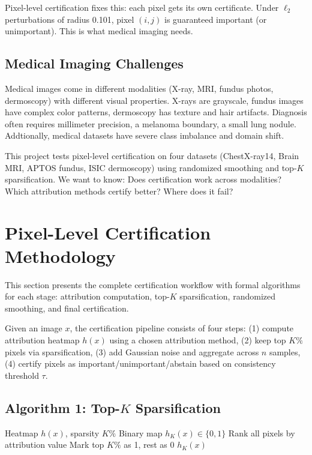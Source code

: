 \documentclass[11pt]{article}
\begin{document}
Pixel-level certification fixes this: each pixel gets its own certificate. Under $\ell_2$ perturbations of radius 0.101, pixel $(i,j)$ is guaranteed important (or unimportant). This is what medical imaging needs.

\subsection{Medical Imaging Challenges}

Medical images come in different modalities (X-ray, MRI, fundus photos, dermoscopy) with different visual properties. X-rays are grayscale, fundus images have complex color patterns, dermoscopy has texture and hair artifacts. Diagnosis often requires millimeter precision, a melanoma boundary, a small lung nodule. Addtionally, medical datasets have severe class imbalance and domain shift.

This project tests pixel-level certification on four datasets (ChestX-ray14, Brain MRI, APTOS fundus, ISIC dermoscopy) using randomized smoothing and top-$K$ sparsification. We want to know: Does certification work across modalities? Which attribution methods certify better? Where does it fail?

\section{Pixel-Level Certification Methodology}

This section presents the complete certification workflow with formal algorithms for each stage: attribution computation, top-$K$ sparsification, randomized smoothing, and final certification.

Given an image $x$, the certification pipeline consists of four steps: (1) compute attribution heatmap $h(x)$ using a chosen attribution method, (2) keep top $K\%$ pixels via sparsification, (3) add Gaussian noise and aggregate across $n$ samples, (4) certify pixels as important/unimportant/abstain based on consistency threshold $\tau$.

\subsection{Algorithm 1: Top-$K$ Sparsification}

\begin{algorithm}[H]
\caption{Top-$K$ Sparsification}
\label{alg:topk_sparsification}
\begin{algorithmic}[1]
\REQUIRE Heatmap $h(x)$, sparsity $K\%$
\ENSURE Binary map $h_K(x) \in \{0,1\}$
\STATE Rank all pixels by attribution value
\STATE Mark top $K\%$ as 1, rest as 0
\RETURN $h_K(x)$
\end{algorithmic}
\end{algorithm}
\end{document}
